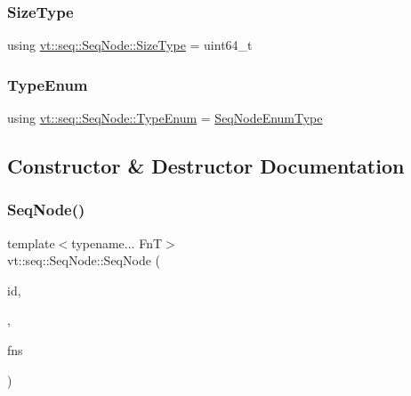 \mbox{\label{structvt_1_1seq_1_1_seq_node_af2b8ae88c3519f2a6142915ddc974c9d}} 
\subsubsection{\texorpdfstring{Size\+Type}{SizeType}}
{\footnotesize\ttfamily using \hyperlink{structvt_1_1seq_1_1_seq_node_af2b8ae88c3519f2a6142915ddc974c9d}{vt\+::seq\+::\+Seq\+Node\+::\+Size\+Type} =  uint64\+\_\+t}

\mbox{\label{structvt_1_1seq_1_1_seq_node_ac24353353c002acd8c5d6aa533533216}} 
\subsubsection{\texorpdfstring{Type\+Enum}{TypeEnum}}
{\footnotesize\ttfamily using \hyperlink{namespacevt_1_1seq_ae721d4e8b95cf57a7e4169db1929e0f1}{vt\+::seq\+::\+Seq\+Node\+::\+Type\+Enum} =  \hyperlink{namespacevt_1_1seq_ae721d4e8b95cf57a7e4169db1929e0f1}{Seq\+Node\+Enum\+Type}}



\subsection{Constructor \& Destructor Documentation}
\mbox{\label{structvt_1_1seq_1_1_seq_node_acd2c0bf2255d6ebbcc5bc586e333a999}} 
\subsubsection{\texorpdfstring{Seq\+Node()}{SeqNode()}\hspace{0.1cm}{\footnotesize\ttfamily [1/6]}}
{\footnotesize\ttfamily template$<$typename... FnT$>$ \\
vt\+::seq\+::\+Seq\+Node\+::\+Seq\+Node (\begin{DoxyParamCaption}\item[{\hyperlink{namespacevt_1_1seq_a3b612da217ac669d39c159f134ab8434}{Seq\+Type} const \&}]{id,  }\item[{Seq\+Node\+Leaf\+Tag}]{,  }\item[{FnT \&\&...}]{fns }\end{DoxyParamCaption})}

